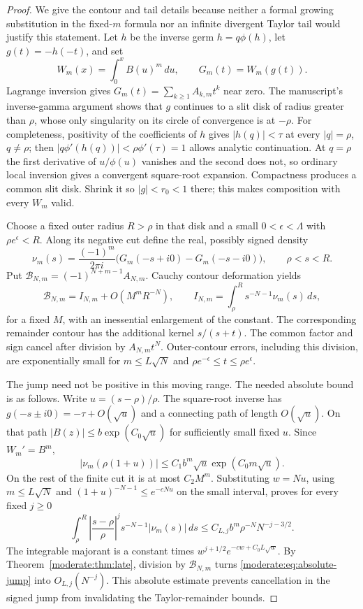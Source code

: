 \begin{proof}
We give the contour and tail details because neither a formal growing
substitution in the fixed-$m$ formula nor an infinite divergent Taylor
tail would justify this statement.
Let $h$ be the inverse germ $h=q\phi(h)$, let $g(t)=-h(-t)$, and set
\[
 W_m(x)=\int_0^x B(u)^m\,du,\qquad G_m(t)=W_m(g(t)).
\]
Lagrange inversion gives $G_m(t)=\sum_{k\ge1}A_{k,m}t^k$ near zero.
The manuscript's inverse-gamma argument shows that $g$ continues to a
slit disk of radius greater than $\rho$, whose only singularity on its
circle of convergence is at $-\rho$. For completeness, positivity of
the coefficients of $h$ gives $|h(q)|<\tau$ at every $|q|=\rho$,
$q\ne\rho$; then
$|q\phi'(h(q))|<\rho\phi'(\tau)=1$ allows analytic continuation.
At $q=\rho$ the first derivative of $u/\phi(u)$ vanishes and the second
does not, so ordinary local inversion gives a convergent square-root
expansion. Compactness produces a common slit disk. Shrink it so
$|g|<r_0<1$ there; this makes composition with every $W_m$ valid.

Choose a fixed outer radius $R>\rho$ in that disk and a small
$0<\epsilon<\Lambda$ with $\rho e^\epsilon<R$. Along its negative cut define
the real, possibly signed density
\[
 \nu_m(s)=\frac{(-1)^m}{2\pi i}
        \bigl(G_m(-s+i0)-G_m(-s-i0)\bigr),\qquad \rho<s<R.
\]
Put $\mathcal B_{N,m}=(-1)^{N+m-1}A_{N,m}$.
Cauchy contour deformation yields
\begin{equation}\label{moderate:eq:cut-coeff}
 \mathcal B_{N,m}=I_{N,m}+O(M^mR^{-N}),\qquad
 I_{N,m}=\int_\rho^R s^{-N-1}\nu_m(s)\,ds,
\end{equation}
for a fixed $M$, with an inessential enlargement of the constant.
The corresponding remainder contour has the additional kernel
$s/(s+t)$. The common factor and sign cancel after division by
$A_{N,m}t^N$. Outer-contour errors, including this division, are
exponentially small for $m\le L\sqrt{N}$ and
$\rho e^{-\epsilon}\le t\le\rho e^\epsilon$.

The jump need not be positive in this moving range. The needed absolute
bound is as follows. Write $u=(s-\rho)/\rho$. The square-root inverse
has $g(-s\pm i0)=-\tau+O(\sqrt{u})$ and a connecting path of length
$O(\sqrt{u})$. On that path
$|B(z)|\le b\exp(C_0\sqrt{u})$ for sufficiently small fixed $u$.
Since $W_m'=B^m$,
\[
 |\nu_m(\rho(1+u))|
 \le C_1 b^m\sqrt{u}\exp(C_0m\sqrt{u}).
\]
On the rest of the finite cut it is at most $C_2M^m$. Substituting
$w=Nu$, using $m\le L\sqrt{N}$ and
$(1+u)^{-N-1}\le e^{-cNu}$ on the small interval, proves for every
fixed $j\ge0$
\begin{equation}\label{moderate:eq:absolute-jump}
 \int_\rho^R \left|\frac{s-\rho}{\rho}\right|^j
    s^{-N-1}|\nu_m(s)|\,ds
 \le C_{L,j} b^m\rho^{-N}N^{-j-3/2}.
\end{equation}
The integrable majorant is a constant times
$w^{j+1/2}e^{-cw+C_0L\sqrt{w}}$.
By Theorem~\ref{moderate:thm:late}, division by $\mathcal B_{N,m}$
turns \eqref{moderate:eq:absolute-jump} into $O_{L,j}(N^{-j})$.
This absolute estimate prevents cancellation in the signed jump from
invalidating the Taylor-remainder bounds.


\end{proof}
